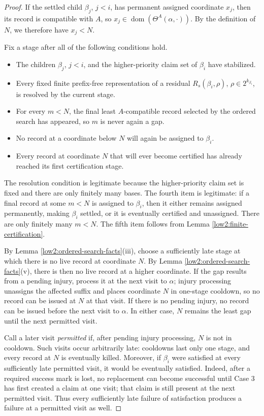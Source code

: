 \documentclass[10pt,a4paper]{amsart}
\begin{document}
\begin{proof}
If the settled child $\beta_j$, $j<i$, has permanent assigned coordinate
$x_j$, then its record is compatible with $A$, so
$x_j\in\operatorname{dom}(\Theta^A(\alpha,\cdot))$. By the definition of
$N$, we therefore have $x_j<N$.

Fix a stage after all of the following conditions hold.
\begin{itemize}
\item The children $\beta_j$, $j<i$, and the higher-priority claim set of
      $\beta_i$ have stabilized.
\item Every fixed finite prefix-free representation of a residual
      $R_s(\beta_i,\rho)$, $\rho\in2^{k_{\beta_i}}$, is resolved by the
      current stage.
\item For every $m<N$, the final least $A$-compatible record selected by the
      ordered search has appeared, so $m$ is never again a gap.
\item No record at a coordinate below $N$ will again be assigned to
      $\beta_i$.
\item Every record at coordinate $N$ that will ever become certified has
      already reached its first certification stage.
\end{itemize}
The resolution condition is legitimate because the higher-priority claim
set is fixed and there are only finitely many bases. The fourth item is
legitimate: if a final record at some $m<N$ is assigned to
$\beta_i$, then it either remains assigned permanently, making $\beta_i$
settled, or it is eventually certified and unassigned. There are only
finitely many $m<N$. The fifth item follows from Lemma
\ref{low2:finite-certification}.

By Lemma \ref{low2:ordered-search-facts}(iii), choose a sufficiently late
stage at which there is no live record at coordinate $N$. By Lemma
\ref{low2:ordered-search-facts}(v), there is then no live record at a higher
coordinate. If the gap results from a pending injury, process it at the next
visit to $\alpha$; injury processing unassigns the affected suffix and places
coordinate $N$ in one-stage cooldown, so no record can be issued at $N$ at
that visit. If there is no pending injury, no record can be issued before the
next visit to $\alpha$. In either case, $N$ remains the least gap until the
next permitted visit.

Call a later visit \emph{permitted} if, after pending injury processing,
$N$ is not in cooldown. Such visits occur arbitrarily late: cooldowns last
only one stage, and
every record at $N$ is eventually killed. Moreover, if $\beta_i$ were
satisfied at every sufficiently late permitted visit, it would be eventually
satisfied. Indeed, after a required success mark is lost, no replacement can
become successful until Case 3 has first created a claim at one visit; that
claim is still present at the next permitted visit. Thus every sufficiently
late failure of satisfaction produces a failure at a permitted visit as well.


\end{proof}
\end{document}
